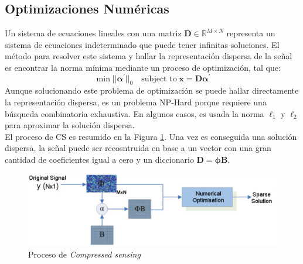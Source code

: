 \subsection{Optimizaciones Num\'ericas}

Un sistema de ecuaciones lineales con una matriz $\boldsymbol{D} \in \mathbb{R}^{M \times N}$ representa un sistema de ecuaciones indeterminado que puede tener infinitas soluciones. El m\'etodo para resolver este sistema y hallar la representaci\'on dispersa de la se\~nal es encontrar la norma m\'inima mediante un proceso de optimizaci\'on, tal que: 
\begin{equation}
\min||\boldsymbol{\alpha^\prime}||_0 \quad \textrm{subject to} \; \boldsymbol{x} = \boldsymbol{D \alpha^\prime}
\end{equation}
Aunque solucionando este problema de optimizaci\'on se puede hallar directamente la representaci\'on dispersa, es un problema NP-Hard porque requiere una b\'usqueda combinatoria exhaustiva. En algunos casos, es usada la norma $\ell_1$ y $\ell_2$ para aproximar la soluci\'on dispersa. \\


El proceso de CS es resumido en la Figura \ref{fig:compressive}. Una vez es conseguida una soluci\'on dispersa, la se\~nal puede ser recosntruida en base a un vector con una gran cantidad de coeficientes igual a cero y un diccionario $\boldsymbol{D}=\boldsymbol{\phi B}$.
\begin{figure}[!h]
\centering
\includegraphics[width=\textwidth]{images/sparse.eps}
\caption[Proceso de \textit{Compressed sensing}]{Proceso de \textit{Compressed sensing} \cite{compressive}}
\label{fig:compressive}
\end{figure}











